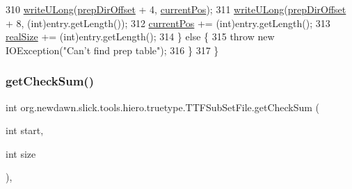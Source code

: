 \begin{DoxyCode}
310             \mbox{\hyperlink{classorg_1_1newdawn_1_1slick_1_1tools_1_1hiero_1_1truetype_1_1_t_t_f_sub_set_file_a20ed1072913a1ad998d59a761e8c4817}{writeULong}}(\mbox{\hyperlink{classorg_1_1newdawn_1_1slick_1_1tools_1_1hiero_1_1truetype_1_1_t_t_f_sub_set_file_a34b073259753c13e24288e0144019b84}{prepDirOffset}} + 4, \mbox{\hyperlink{classorg_1_1newdawn_1_1slick_1_1tools_1_1hiero_1_1truetype_1_1_t_t_f_sub_set_file_a5027011db0d9c307afa8de09102eaa10}{currentPos}});
311             \mbox{\hyperlink{classorg_1_1newdawn_1_1slick_1_1tools_1_1hiero_1_1truetype_1_1_t_t_f_sub_set_file_a20ed1072913a1ad998d59a761e8c4817}{writeULong}}(\mbox{\hyperlink{classorg_1_1newdawn_1_1slick_1_1tools_1_1hiero_1_1truetype_1_1_t_t_f_sub_set_file_a34b073259753c13e24288e0144019b84}{prepDirOffset}} + 8, (\textcolor{keywordtype}{int})entry.getLength());
312             \mbox{\hyperlink{classorg_1_1newdawn_1_1slick_1_1tools_1_1hiero_1_1truetype_1_1_t_t_f_sub_set_file_a5027011db0d9c307afa8de09102eaa10}{currentPos}} += (int)entry.getLength();
313             \mbox{\hyperlink{classorg_1_1newdawn_1_1slick_1_1tools_1_1hiero_1_1truetype_1_1_t_t_f_sub_set_file_afbd6781b24988e94a488596aa954ee3c}{realSize}} += (int)entry.getLength();
314         \} \textcolor{keywordflow}{else} \{
315             \textcolor{keywordflow}{throw} \textcolor{keyword}{new} IOException(\textcolor{stringliteral}{"Can't find prep table"});
316         \}
317     \}
\end{DoxyCode}
\mbox{\label{classorg_1_1newdawn_1_1slick_1_1tools_1_1hiero_1_1truetype_1_1_t_t_f_sub_set_file_a1626ba6cefcce691896866cd811ea675}} 
\subsubsection{\texorpdfstring{get\+Check\+Sum()}{getCheckSum()}}
{\footnotesize\ttfamily int org.\+newdawn.\+slick.\+tools.\+hiero.\+truetype.\+T\+T\+F\+Sub\+Set\+File.\+get\+Check\+Sum (\begin{DoxyParamCaption}\item[{int}]{start,  }\item[{int}]{size }\end{DoxyParamCaption})\hspace{0.3cm}{\ttfamily [inline]}, {\ttfamily [private]}}

